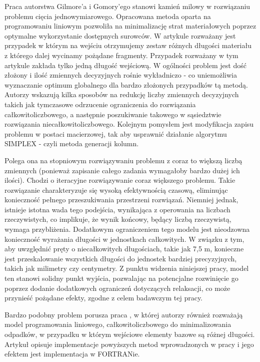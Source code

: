 Praca autorstwa Gilmore'a i Gomory'ego stanowi \cite{linear-programming-gilmore} kamień milowy w rozwiązaniu problemu cięcia jednowymiarowego. Opracowana metoda oparta na programowaniu liniowym pozwoliła na minimalizację strat materiałowych poprzez optymalne wykorzystanie dostępnych surowców. W artykule rozważany jest przypadek w którym na wejściu otrzymujemy zestaw różnych długości materiału z którego dalej wycinamy pożądane fragmenty. Przypadek rozważany w tym artykule zakłada tylko jedną długość wejściową. W ogólności problem jest dość złożony i ilość zmiennych decyzyjnych rośnie wykładniczo - co uniemożliwia wyznaczanie optimum globalnego dla bardzo złożonych przypadków tą metodą. Autorzy wskazują kilka sposobów na redukcję liczby zmiennych decyzyjnych takich jak tymczasowe odrzucenie ograniczenia do rozwiązania całkowitoliczbowego, a następnie poszukiwanie takowego w sąsiedztwie rozwiązania niecałkowitoliczbowego. Kolejnym pomysłem jest modyfikacja zapisu problemu w postaci macierzowej, tak aby usprawnić działanie algorytmu SIMPLEX - czyli metoda generacji kolumn.

Polega ona na stopniowym rozwiązywaniu problemu z coraz to większą liczbą zmiennych (ponieważ zapisanie całego zadania wymagałoby bardzo dużej ich ilości). Chodzi o iteracyjne rozwiązywanie coraz większego problemu. Takie rozwiązanie charakteryzuje się wysoką efektywnością czasową, eliminując konieczność pełnego przeszukiwania przestrzeni rozwiązań. Niemniej jednak, istnieje istotna wada tego podejścia, wynikająca z operowania na liczbach rzeczywistych, co implikuje, że wynik końcowy, będący liczbą rzeczywistą, wymaga przybliżenia. Dodatkowym ograniczeniem tego modelu jest nieodzowna konieczność wyrażania długości w jednostkach całkowitych. W związku z tym, aby uwzględnić pręty o niecałkowitych długościach, takie jak 7,5 m, konieczne jest przeskalowanie wszystkich długości do jednostek bardziej precyzyjnych, takich jak milimetry czy centymetry. Z punktu widzenia niniejszej pracy, model ten stanowi solidny punkt wyjścia, pozwalając na potencjalne rozwinięcie go poprzez dodanie dodatkowych ograniczeń dotyczących relaksacji, co może przynieść pożądane efekty, zgodne z celem badawczym tej pracy.

Bardzo podobny problem porusza praca , w której autorzy również rozważają model programowania liniowego, całkowitoliczbowego do minimalizowania odpadków, w przypadku w którym wejściowe elementy bazowe są różnej długości. Artykuł opisuje implementacje powyższych metod wprowadzonych w pracy \cite{linear-programming-gilmore} i jego efektem jest implementacja w FORTRANie.

